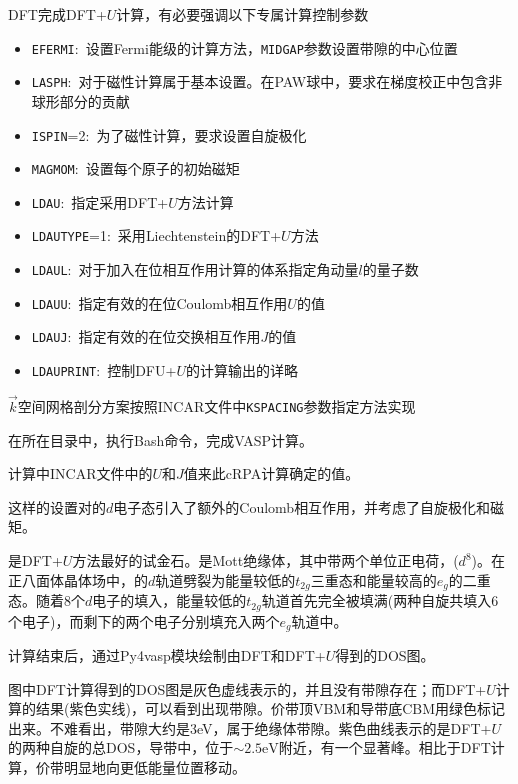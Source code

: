 \textrm{DFT}完成\textrm{DFT+}$U$计算，有必要强调以下专属计算控制参数
\begin{itemize}
	\item \texttt{EFERMI}:~设置\textrm{Fermi}能级的计算方法，\texttt{MIDGAP}参数设置带隙的中心位置
	\item \texttt{LASPH}:~对于磁性计算属于基本设置。在\textrm{PAW}球中，要求在梯度校正中包含非球形部分的贡献
	\item \texttt{ISPIN}=2:~为了磁性计算，要求设置自旋极化
	\item \texttt{MAGMOM}:~设置每个原子的初始磁矩
	\item \texttt{LDAU}:~指定采用\textrm{DFT+}$U$方法计算
	\item \texttt{LDAUTYPE}=1:~采用\textrm{Liechtenstein}的\textrm{DFT+}$U$方法
	\item \texttt{LDAUL}:~对于加入在位相互作用计算的体系指定角动量$l$的量子数
	\item \texttt{LDAUU}:~指定有效的在位\textrm{Coulomb}相互作用$U$的值
	\item \texttt{LDAUJ}:~指定有效的在位交换相互作用$J$的值
	\item \texttt{LDAUPRINT}:~控制\textrm{DFU+}$U$的计算输出的详略
\end{itemize}

$\vec k$空间网格剖分方案按照\textrm{INCAR}文件中\texttt{KSPACING}参数指定方法实现

在所在目录中，执行\textrm{Bash}命令，完成\textrm{VASP}计算。

计算中\textrm{INCAR}文件中的$U$和$J$值来此\textrm{cRPA}计算确定的值。

这样的设置对的$d	电子态引入了额外的$\textrm{Coulomb}相互作用，并考虑了自旋极化和磁矩。%

是\textrm{DFT+}$U$方法最好的试金石。是\textrm{Mott}绝缘体，其中带两个单位正电荷，($d^8$)。在正八面体晶体场中，的$d$轨道劈裂为能量较低的$t_{2g}$三重态和能量较高的$e_g$的二重态。随着8个$d$电子的填入，能量较低的$t_{2g}$轨道首先完全被填满(两种自旋共填入6个电子)，而剩下的两个电子分别填充入两个$e_g$轨道中。

计算结束后，通过\textrm{Py4vasp}模块绘制由\textrm{DFT}和\textrm{DFT+}$U$得到的\textrm{DOS}图。

图中\textrm{DFT}计算得到的\textrm{DOS}图是灰色虚线表示的，并且没有带隙存在；而\textrm{DFT+}$U$计算的结果(紫色实线)，可以看到出现带隙。价带顶\textrm{VBM}和导带底\textrm{CBM}用绿色标记出来。不难看出，带隙大约是\textrm{3eV}，属于绝缘体带隙。紫色曲线表示的是\textrm{DFT+}$U$的两种自旋的总\textrm{DOS}，导带中，位于$\sim2.5\mathrm{eV}$附近，有一个显著峰。相比于\textrm{DFT}计算，价带明显地向更低能量位置移动。


